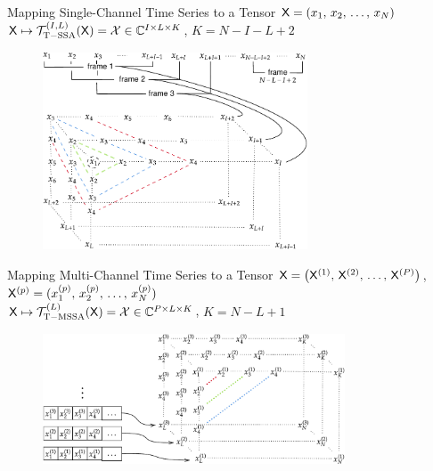 \documentclass[pdf, unicode, ucs, notheorems]{beamer}
\theoremstyle{definition}
\begin{document}
\begin{frame}{Mapping Single-Channel Time Series to a Tensor}
  $\mathsf{X} = (x_1,\, x_2,\, \ldots,\, x_N)$\\ \medskip
  $\mathsf{X} \mapsto \mathcal{T}_{\mathrm{T-SSA}}^{(I, L)}(\mathsf{X}) = \mathcal{X} \in
  \mathbb{C}^{I\times L \times K}$, $K = N - I - L + 2$

  \begin{figure}[!ht]
    \centering
    \includegraphics[width=0.7\textwidth]{tens-injection-wide.pdf}
  \end{figure}
\end{frame}

\begin{frame}{Mapping Multi-Channel Time Series to a Tensor}
  $\mathsf{X} = \left(\mathsf{X}^{(1)},\, \mathsf{X}^{(2)},\, \ldots,\,
  \mathsf{X}^{(P)}\right)$, $\mathsf{X}^{(p)} = (x_1^{(p)},\, x_2^{(p)},\,
  \ldots,\, x_N^{(p)})$\\ \medskip
  $\mathsf{X} \mapsto \mathcal{T}_{\mathrm{T-MSSA}}^{(L)}(\mathsf{X})
  = \mathcal{X} \in \mathbb{C}^{P\times L \times K}$, $K = N - L + 1$

  \bigskip

  \begin{figure}[!ht]
    \centering
    \includegraphics[width=0.8\textwidth]{mssa_injection_new.pdf}
  \end{figure}
\end{frame}
\end{document}
